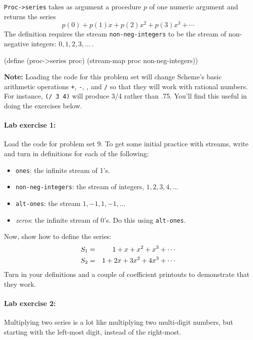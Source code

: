 {\tt Proc->series} takes as argument a procedure $p$ of one numeric
argument and returns the series
\[  p(0) + p(1)x + p(2)x^2 + p(3)x^3 + \cdots  \]
The definition requires the stream {\tt non-neg-integers} to be the stream of
non-negative integers: $0,1,2,3,\ldots{}$\,.

\beginlisp
(define (proc->series proc)
  (stream-map proc non-neg-integers))
\endlisp

\medskip

\noindent
{\bf Note:} Loading the code for this problem set will change
Scheme's basic arithmetic operations {\tt +}, {\tt -}, {\tt *}, and
{\tt /} so that they will work with rational numbers.  For instance,
{\tt (/ 3 4)} will produce 3/4 rather than .75.  You'll find this
useful in doing the exercises below.


\paragraph{Lab exercise 1:}
Load the code for problem set 9.  To get some initial practice with
streams, write and turn in definitions for each of the following:

\begin{itemize}

\item {\tt ones}: the infinite stream of 1's.

\item {\tt non-neg-integers}:  the stream of integers, $1, 2, 3, 4,
\ldots$

\item {\tt alt-ones}:  the stream $1, -1, 1, -1, \ldots$

\item {\it zeros}:  the infinite stream of 0's.  Do this using {\tt alt-ones}.

\end{itemize}


Now, show how to define the series:
\begin{eqnarray*}
S_1 &=& 1 + x + x^2 + x^3 + \cdots \cr
S_2 &=& 1 + 2x + 3x^2 + 4x^3 + \cdots
\end{eqnarray*}
Turn in your definitions and a couple of coefficient printouts to
demonstrate that they work.


\paragraph{Lab exercise 2:}

Multiplying two series is a lot like multiplying two multi-digit numbers,
but starting with the left-most digit, instead of the right-most.

